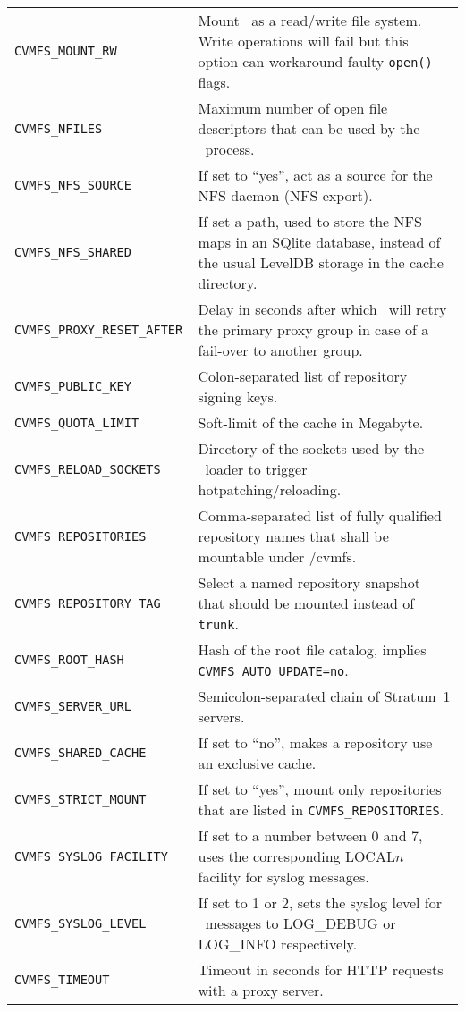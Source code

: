 \begin{longtable}{lX}
		\tt CVMFS\_MOUNT\_RW				& Mount \cvmfs\ as a read/write file system.  Write operations will fail but this option can workaround faulty \texttt{open()} flags.\\
		\tt CVMFS\_NFILES					& Maximum number of open file descriptors that can be used by the \cvmfs\ process.\\
		\tt CVMFS\_NFS\_SOURCE				& If set to ``yes'', act as a source for the NFS daemon (NFS export).\\
		\tt CVMFS\_NFS\_SHARED				& If set a path, used to store the NFS maps in an SQlite database, instead of the usual LevelDB storage in the cache directory.\\
		\tt CVMFS\_PROXY\_RESET\_AFTER		& Delay in seconds after which \cvmfs\ will retry the primary proxy group in case of a fail-over to another group.\\
		\tt CVMFS\_PUBLIC\_KEY				& Colon-separated list of repository signing keys.\\
		\tt CVMFS\_QUOTA\_LIMIT			& Soft-limit of the cache in Megabyte.\\
		\tt CVMFS\_RELOAD\_SOCKETS			& Directory of the sockets used by the \cvmfs\ loader to trigger hotpatching/reloading.\\
		\tt CVMFS\_REPOSITORIES			& Comma-separated list of fully qualified repository names that shall be mountable under /cvmfs.\\
		\tt CVMFS\_REPOSITORY\_TAG			& Select a named repository snapshot that should be mounted instead of \texttt{trunk}.\\
		\tt CVMFS\_ROOT\_HASH				& Hash of the root file catalog, implies \texttt{CVMFS\_AUTO\_UPDATE=no}.\\
		\tt CVMFS\_SERVER\_URL				& Semicolon-separated chain of Stratum~1 servers.\\
		\tt CVMFS\_SHARED\_CACHE			& If set to ``no'', makes a repository use an exclusive cache.\\
		\tt CVMFS\_STRICT\_MOUNT			& If set to ``yes'', mount only repositories that are listed in \texttt{CVMFS\_REPOSITORIES}.\\
		\tt CVMFS\_SYSLOG\_FACILITY		& If set to a number between 0 and 7, uses the corresponding LOCAL$n$ facility for syslog messages.\\
		\tt CVMFS\_SYSLOG\_LEVEL			& If set to 1 or 2, sets the syslog level for \cvmfs\ messages to LOG\_DEBUG or LOG\_INFO respectively.\\
		\tt CVMFS\_TIMEOUT 				& Timeout in seconds for HTTP requests with a proxy server.\\

\end{longtable}
